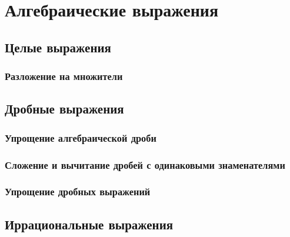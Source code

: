 \chapter{Алгебраические выражения}
\section{Целые выражения}
	\subsection{Разложение на множители}
\section{Дробные выражения}
	\subsection{Упрощение алгебраической дроби}
	\subsection{Сложение и вычитание дробей с одинаковыми знаменателями}
	\subsection{Упрощение дробных выражений}
\section{Иррациональные выражения}
